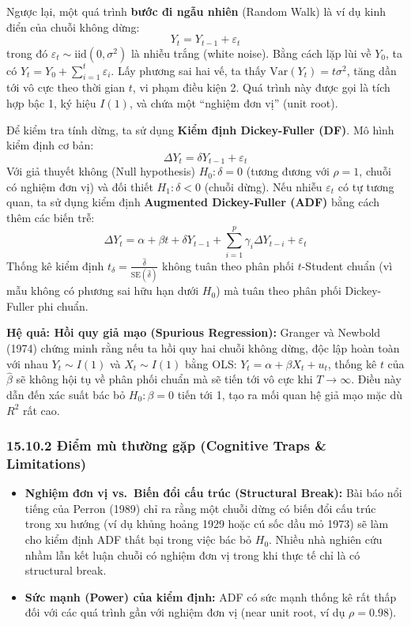 \documentclass[
]{article}
\providecommand{\tightlist}{%
  \setlength{\itemsep}{0pt}\setlength{\parskip}{0pt}}
\begin{document}
Ngược lại, một quá trình \textbf{bước đi ngẫu nhiên} (Random Walk) là ví
dụ kinh điển của chuỗi không dừng: \[ Y_t = Y_{t-1} + \varepsilon_t \]
trong đó \(\varepsilon_t \sim \text{iid}(0, \sigma^2)\) là nhiễu trắng
(white noise). Bằng cách lặp lùi về \(Y_0\), ta có
\(Y_t = Y_0 + \sum_{i=1}^t \varepsilon_i\). Lấy phương sai hai vế, ta
thấy \(\text{Var}(Y_t) = t\sigma^2\), tăng dần tới vô cực theo thời gian
\(t\), vi phạm điều kiện 2. Quá trình này được gọi là tích hợp bậc 1, ký
hiệu \(I(1)\), và chứa một ``nghiệm đơn vị'' (unit root).

Để kiểm tra tính dừng, ta sử dụng \textbf{Kiểm định Dickey-Fuller (DF)}.
Mô hình kiểm định cơ bản:
\[ \Delta Y_t = \delta Y_{t-1} + \varepsilon_t \] Với giả thuyết không
(Null hypothesis) \(H_0: \delta = 0\) (tương đương với \(\rho = 1\),
chuỗi có nghiệm đơn vị) và đối thiết \(H_1: \delta < 0\) (chuỗi dừng).
Nếu nhiễu \(\varepsilon_t\) có tự tương quan, ta sử dụng kiểm định
\textbf{Augmented Dickey-Fuller (ADF)} bằng cách thêm các biến trễ:
\[ \Delta Y_t = \alpha + \beta t + \delta Y_{t-1} + \sum_{i=1}^{p} \gamma_i \Delta Y_{t-i} + \varepsilon_t \]
Thống kê kiểm định
\(t_{\delta} = \frac{\hat{\delta}}{\text{SE}(\hat{\delta})}\) không tuân
theo phân phối \(t\)-Student chuẩn (vì mẫu không có phương sai hữu hạn
dưới \(H_0\)) mà tuân theo phân phối Dickey-Fuller phi chuẩn.

\textbf{Hệ quả: Hồi quy giả mạo (Spurious Regression):} Granger và
Newbold (1974) chứng minh rằng nếu ta hồi quy hai chuỗi không dừng, độc
lập hoàn toàn với nhau \(Y_t \sim I(1)\) và \(X_t \sim I(1)\) bằng OLS:
\(Y_t = \alpha + \beta X_t + u_t\), thống kê \(t\) của \(\hat{\beta}\)
sẽ không hội tụ về phân phối chuẩn mà sẽ tiến tới vô cực khi
\(T \to \infty\). Điều này dẫn đến xác suất bác bỏ \(H_0: \beta=0\) tiến
tới 1, tạo ra mối quan hệ giả mạo mặc dù \(R^2\) rất cao.

\subsubsection{15.10.2 Điểm mù thường gặp (Cognitive Traps \&
Limitations)}\label{ux111iux1ec3m-muxf9-thux1b0ux1eddng-gux1eb7p-cognitive-traps-limitations-106}

\begin{itemize}
\tightlist
\item
  \textbf{Nghiệm đơn vị vs.~Biến đổi cấu trúc (Structural Break):} Bài
  báo nổi tiếng của Perron (1989) chỉ ra rằng một chuỗi dừng có biến đổi
  cấu trúc trong xu hướng (ví dụ khủng hoảng 1929 hoặc cú sốc dầu mỏ
  1973) sẽ làm cho kiểm định ADF thất bại trong việc bác bỏ \(H_0\).
  Nhiều nhà nghiên cứu nhầm lẫn kết luận chuỗi có nghiệm đơn vị trong
  khi thực tế chỉ là có structural break.
\item
  \textbf{Sức mạnh (Power) của kiểm định:} ADF có sức mạnh thống kê rất
  thấp đối với các quá trình gần với nghiệm đơn vị (near unit root, ví
  dụ \(\rho = 0.98\)).
\end{itemize}
\end{document}
